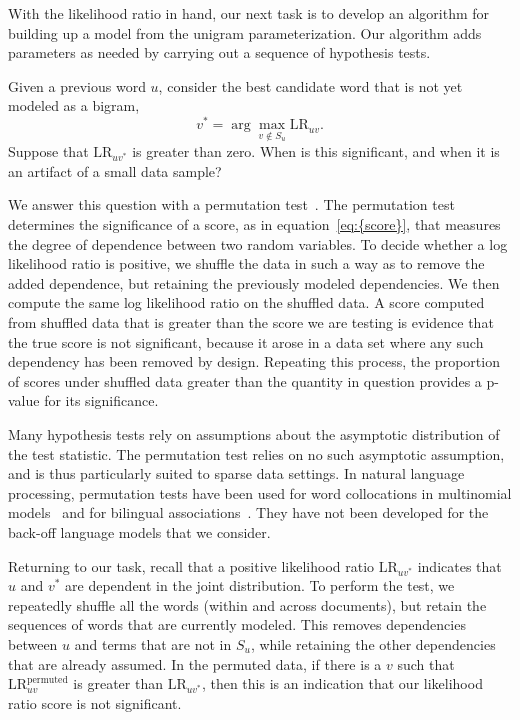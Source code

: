 \documentclass[11pt]{article}
\begin{document}
With the likelihood ratio in hand, our next task is to develop an
algorithm for building up a model from the unigram parameterization.
Our algorithm adds parameters as needed by carrying out a sequence of
hypothesis tests.

Given a previous word $u$, consider the best candidate word that is
not yet modeled as a bigram,
\begin{equation*}
  v^* = \arg \max_{v \notin S_u} {\textrm{LR}}_{uv}.
\end{equation*}
Suppose that ${\textrm{LR}}_{uv^*}$ is greater than zero.  When is this
significant, and when it is an artifact of a small data sample?

We answer this question with a permutation
test~\citep{Pitman:1937,Good:2000}.  The permutation test determines
the significance of a score, as in {equation~\eqref{eq:{score}}}, that measures the
degree of dependence between two random variables.  To decide whether
a log likelihood ratio is positive, we shuffle the data in such a way
as to remove the added dependence, but retaining the previously
modeled dependencies.  We then compute the same log likelihood ratio
on the shuffled data.  A score computed from shuffled data that is
greater than the score we are testing is evidence that the true score
is not significant, because it arose in a data set where any such
dependency has been removed by design.  Repeating this process, the
proportion of scores under shuffled data greater than the quantity in
question provides a p-value for its significance.

Many hypothesis tests rely on assumptions about the asymptotic
distribution of the test statistic.  The permutation test relies on no
such asymptotic assumption, and is thus particularly suited to sparse
data settings.  In natural language processing, permutation tests have
been used for word collocations in multinomial
models~\citep{Pedersen:1996} and for bilingual
associations~\citep{Moore:2004}.  They have not been developed for the
back-off language models that we consider.

Returning to our task, recall that a positive likelihood ratio
${\textrm{LR}}_{uv^*}$ indicates that $u$ and $v^*$ are dependent in the joint
distribution.  To perform the test, we repeatedly shuffle all the
words (within and across documents), but retain the sequences of words
that are currently modeled.  This removes dependencies between $u$ and
terms that are not in $S_u$, while retaining the other dependencies
that are already assumed.  In the permuted data, if there is a $v$
such that ${\textrm{LR}}^{\textrm{permuted}}_{uv}$ is greater than ${\textrm{LR}}_{uv^*}$,
then this is an indication that our likelihood ratio score is not
significant.
\end{document}

